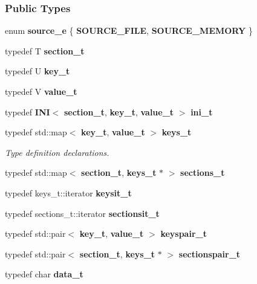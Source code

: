 \subsubsection*{Public Types}
\begin{DoxyCompactItemize}
\item 
enum {\bf source\+\_\+e} \{ {\bf S\+O\+U\+R\+C\+E\+\_\+\+F\+I\+LE}, 
{\bf S\+O\+U\+R\+C\+E\+\_\+\+M\+E\+M\+O\+RY}
 \}
\item 
typedef T {\bf section\+\_\+t}
\item 
typedef U {\bf key\+\_\+t}
\item 
typedef V {\bf value\+\_\+t}
\item 
typedef {\bf I\+NI}$<$ {\bf section\+\_\+t}, {\bf key\+\_\+t}, {\bf value\+\_\+t} $>$ {\bf ini\+\_\+t}
\item 
typedef std\+::map$<$ {\bf key\+\_\+t}, {\bf value\+\_\+t} $>$ {\bf keys\+\_\+t}
\begin{DoxyCompactList}\small\item\em Type definition declarations. \end{DoxyCompactList}\item 
typedef std\+::map$<$ {\bf section\+\_\+t}, {\bf keys\+\_\+t} $\ast$ $>$ {\bf sections\+\_\+t}
\item 
typedef keys\+\_\+t\+::iterator {\bf keysit\+\_\+t}
\item 
typedef sections\+\_\+t\+::iterator {\bf sectionsit\+\_\+t}
\item 
typedef std\+::pair$<$ {\bf key\+\_\+t}, {\bf value\+\_\+t} $>$ {\bf keyspair\+\_\+t}
\item 
typedef std\+::pair$<$ {\bf section\+\_\+t}, {\bf keys\+\_\+t} $\ast$ $>$ {\bf sectionspair\+\_\+t}
\item 
typedef char {\bf data\+\_\+t}
\end{DoxyCompactItemize}
